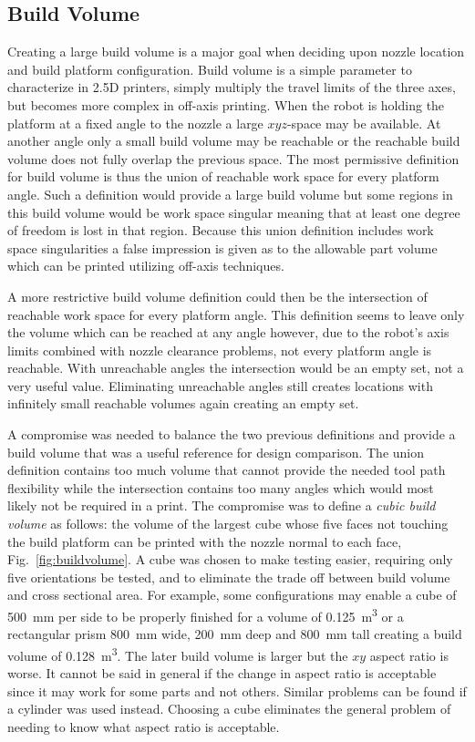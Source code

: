 \documentclass[main.tex]{subfiles}
\begin{document}
\subsection{Build Volume}
Creating a large build volume is a major goal when deciding upon nozzle location and build platform configuration.
Build volume is a simple parameter to characterize in 2.5D printers, simply multiply the travel limits of the three axes, but becomes more complex in off-axis printing.
When the robot is holding the platform at a fixed angle to the nozzle a large $xyz$\nobreakdash-space may be available.
At another angle only a small build volume may be reachable or the reachable build volume does not fully overlap the previous space.
The most permissive definition for build volume is thus the union of reachable work space for every platform angle.
Such a definition would provide a large build volume but some regions in this build volume would be work space singular meaning that at least one degree of freedom is lost in that region.
Because this union definition includes work space singularities a false impression is given as to the allowable part volume which can be printed utilizing off-axis techniques.

A more restrictive build volume definition could then be the intersection of reachable work space for every platform angle.
This definition seems to leave only the volume which can be reached at any angle however, due to the robot's axis limits combined with nozzle clearance problems, not every platform angle is reachable.
With unreachable angles the intersection would be an empty set, not a very useful value.
Eliminating unreachable angles still creates locations with infinitely small reachable volumes again creating an empty set.

A compromise was needed to balance the two previous definitions and provide a build volume that was a useful reference for design comparison.
The union definition contains too much volume that cannot provide the needed tool path flexibility while the intersection contains too many angles which would most likely not be required in a print.
The compromise was to define a \emph{cubic build volume} as follows: the volume of the largest cube whose five faces not touching the build platform can be printed with the nozzle normal to each face, Fig.~\ref{fig:buildvolume}.
A cube was chosen to make testing easier, requiring only five orientations be tested, and to eliminate the trade off between build volume and cross sectional area.
For example, some configurations may enable a cube of \SI{500}{mm} per side to be properly finished for a volume of \SI{0.125}{m^3} or a rectangular prism \SI{800}{mm} wide, \SI{200}{mm} deep and \SI{800}{mm} tall creating a build volume of \SI{0.128}{m^3}.
The later build volume is larger but the $xy$ aspect ratio is worse.
It cannot be said in general if the change in aspect ratio is acceptable since it may work for some parts and not others.
Similar problems can be found if a cylinder was used instead.
Choosing a cube eliminates the general problem of needing to know what aspect ratio is acceptable.
\end{document}
